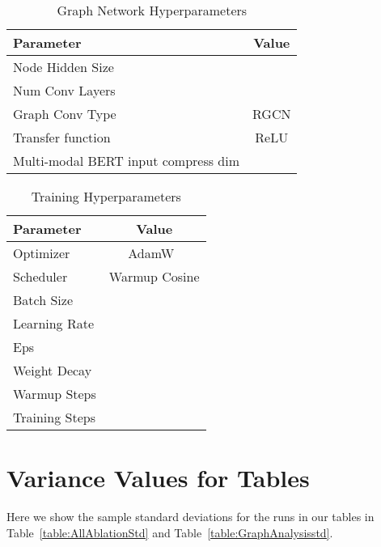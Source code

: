 \documentclass[final]{cvpr}
\providecommand{\MMBERTBase}{Multi-modal BERT\xspace}
\begin{document}
\begin{table}[h]
\begin{center}
\begin{tabular}{@{}lc@{}}
\toprule
Parameter & Value\\ \midrule
Node Hidden Size &  \\
Num Conv Layers &  \\
Graph Conv Type & RGCN \\
Transfer function & ReLU \\
\MMBERTBase input compress dim &  \\
\bottomrule
\end{tabular}
\end{center}
\caption{Graph Network Hyperparameters}
\label{table:graphparams}
\end{table}

\begin{table}[h]
\begin{center}
\begin{tabular}{@{}lc@{}}
\toprule
Parameter & Value\\ \midrule
Optimizer & AdamW~\cite{kingma2014adam} \\
Scheduler & Warmup Cosine \\
Batch Size &  \\
Learning Rate &  \\
Eps &  \\
Weight Decay &  \\
Warmup Steps &  \\
Training Steps &  \\
\bottomrule
\end{tabular}
\end{center}
\caption{Training Hyperparameters}
\label{table:trainparams}
\end{table}

\section{Variance Values for Tables}
\label{appx:variance}
Here we show the sample standard deviations for the runs in our tables in Table~\ref{table:AllAblationStd} and Table~\ref{table:GraphAnalysisstd}.
\end{document}
